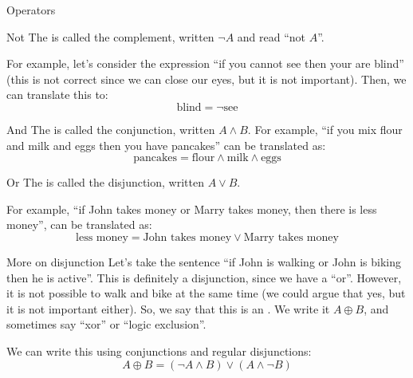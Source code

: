 \documentclass[a4paper]{article}
\begin{document}
\begin{parag}{Operators}
    \begin{subparag}{Not}
        The  is called the complement, written $\lnot A$ and read ``not $A$''.

        For example, let's consider the expression ``if you cannot see then your are blind'' (this is not correct since we can close our eyes, but it is not important). Then, we can translate this to: 
        \[\text{blind} = \lnot\text{see}\]
    \end{subparag}

    \begin{subparag}{And}
        The  is called the conjunction, written $A \land B$. 
        For example, ``if you mix flour and milk and eggs then you have pancakes'' can be translated as: 
        \[\text{pancakes} = \text{flour} \land \text{milk} \land \text{eggs}\]
        
    \end{subparag}
    
    \begin{subparag}{Or}
        The  is called the disjunction, written $A \lor B$.

        For example, ``if John takes money or Marry takes money, then there is less money'', can be translated as: 
        \[\text{less money} = \text{John takes money} \lor \text{Marry takes money}\]
    \end{subparag}
\end{parag}

\begin{parag}{More on disjunction}
    Let's take the sentence ``if John is walking or John is biking then he is active''. This is definitely a disjunction, since we have a ``or''. However, it is not possible to walk and bike at the same time (we could argue that yes, but it is not important either). So, we say that this is an . We write it $A \oplus B$, and sometimes say ``xor'' or ``logic exclusion''.

    We can write this using conjunctions and regular disjunctions: 
    \[A \oplus B = \left(\lnot A \land B\right) \lor\left(A \land\lnot B\right)\]
\end{parag}
\end{document}
